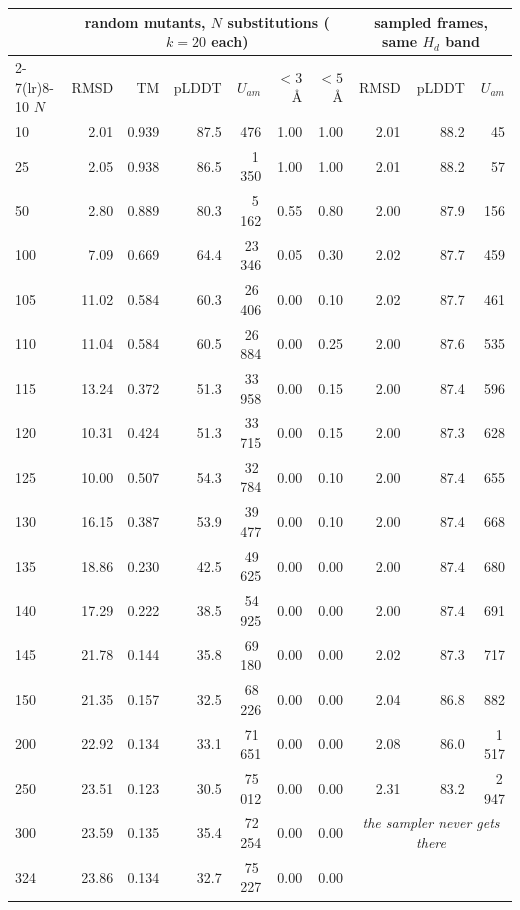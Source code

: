\documentclass[11pt,a4paper]{article}
\begin{document}
\begin{table}[h]
\centering
\footnotesize
\begin{tabular}{lrrrr@{\hspace{0.6em}}rr@{\hspace{1em}}rrr}
\toprule
& \multicolumn{6}{c}{random mutants, $N$ substitutions ($k=20$ each)} & \multicolumn{3}{c}{sampled frames, same $H_d$ band} \\
\cmidrule(lr){2-7}\cmidrule(lr){8-10}
$N$ & RMSD & TM & pLDDT & $U_{am}$ & $<3$\,\AA & $<5$\,\AA & RMSD & pLDDT & $U_{am}$ \\
\midrule
10  & 2.01  & 0.939 & 87.5 & 476    & 1.00 & 1.00 & 2.01 & 88.2 & 45 \\
25  & 2.05  & 0.938 & 86.5 & 1\,350  & 1.00 & 1.00 & 2.01 & 88.2 & 57 \\
50  & 2.80  & 0.889 & 80.3 & 5\,162  & 0.55 & 0.80 & 2.00 & 87.9 & 156 \\
100 & 7.09  & 0.669 & 64.4 & 23\,346 & 0.05 & 0.30 & 2.02 & 87.7 & 459 \\
105 & 11.02 & 0.584 & 60.3 & 26\,406 & 0.00 & 0.10 & 2.02 & 87.7 & 461 \\
110 & 11.04 & 0.584 & 60.5 & 26\,884 & 0.00 & 0.25 & 2.00 & 87.6 & 535 \\
115 & 13.24 & 0.372 & 51.3 & 33\,958 & 0.00 & 0.15 & 2.00 & 87.4 & 596 \\
120 & 10.31 & 0.424 & 51.3 & 33\,715 & 0.00 & 0.15 & 2.00 & 87.3 & 628 \\
125 & 10.00 & 0.507 & 54.3 & 32\,784 & 0.00 & 0.10 & 2.00 & 87.4 & 655 \\
130 & 16.15 & 0.387 & 53.9 & 39\,477 & 0.00 & 0.10 & 2.00 & 87.4 & 668 \\
135 & 18.86 & 0.230 & 42.5 & 49\,625 & 0.00 & 0.00 & 2.00 & 87.4 & 680 \\
140 & 17.29 & 0.222 & 38.5 & 54\,925 & 0.00 & 0.00 & 2.00 & 87.4 & 691 \\
145 & 21.78 & 0.144 & 35.8 & 69\,180 & 0.00 & 0.00 & 2.02 & 87.3 & 717 \\
150 & 21.35 & 0.157 & 32.5 & 68\,226 & 0.00 & 0.00 & 2.04 & 86.8 & 882 \\
200 & 22.92 & 0.134 & 33.1 & 71\,651 & 0.00 & 0.00 & 2.08 & 86.0 & 1\,517 \\
250 & 23.51 & 0.123 & 30.5 & 75\,012 & 0.00 & 0.00 & 2.31 & 83.2 & 2\,947 \\
300 & 23.59 & 0.135 & 35.4 & 72\,254 & 0.00 & 0.00 & \multicolumn{3}{c}{\emph{the sampler never gets there}} \\
324 & 23.86 & 0.134 & 32.7 & 75\,227 & 0.00 & 0.00 & \\

\end{tabular}
\end{table}
\end{document}
